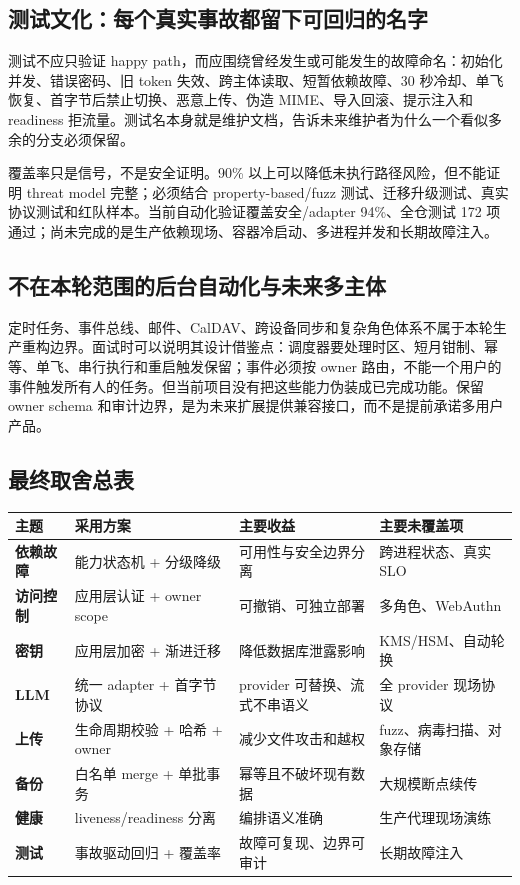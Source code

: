\subsection{测试文化：每个真实事故都留下可回归的名字}

测试不应只验证 happy path，而应围绕曾经发生或可能发生的故障命名：初始化并发、错误密码、旧 token 失效、跨主体读取、短暂依赖故障、30 秒冷却、单飞恢复、首字节后禁止切换、恶意上传、伪造 MIME、导入回滚、提示注入和 readiness 拒流量。测试名本身就是维护文档，告诉未来维护者为什么一个看似多余的分支必须保留。

覆盖率只是信号，不是安全证明。90\% 以上可以降低未执行路径风险，但不能证明 threat model 完整；必须结合 property-based/fuzz 测试、迁移升级测试、真实协议测试和红队样本。当前自动化验证覆盖安全/adapter 94\%、全仓测试 172 项通过；尚未完成的是生产依赖现场、容器冷启动、多进程并发和长期故障注入。

\subsection{不在本轮范围的后台自动化与未来多主体}

定时任务、事件总线、邮件、CalDAV、跨设备同步和复杂角色体系不属于本轮生产重构边界。面试时可以说明其设计借鉴点：调度器要处理时区、短月钳制、幂等、单飞、串行执行和重启触发保留；事件必须按 owner 路由，不能一个用户的事件触发所有人的任务。但当前项目没有把这些能力伪装成已完成功能。保留 owner schema 和审计边界，是为未来扩展提供兼容接口，而不是提前承诺多用户产品。

\subsection{最终取舍总表}

\begin{center}
\small
\begin{tabularx}{\textwidth}{>{\bfseries}lXXX}
\toprule
主题 & 采用方案 & 主要收益 & 主要未覆盖项 \\
\midrule
依赖故障 & 能力状态机 + 分级降级 & 可用性与安全边界分离 & 跨进程状态、真实 SLO \\
访问控制 & 应用层认证 + owner scope & 可撤销、可独立部署 & 多角色、WebAuthn \\
密钥 & 应用层加密 + 渐进迁移 & 降低数据库泄露影响 & KMS/HSM、自动轮换 \\
LLM & 统一 adapter + 首字节协议 & provider 可替换、流式不串语义 & 全 provider 现场协议 \\
上传 & 生命周期校验 + 哈希 + owner & 减少文件攻击和越权 & fuzz、病毒扫描、对象存储 \\
备份 & 白名单 merge + 单批事务 & 幂等且不破坏现有数据 & 大规模断点续传 \\
健康 & liveness/readiness 分离 & 编排语义准确 & 生产代理现场演练 \\
测试 & 事故驱动回归 + 覆盖率 & 故障可复现、边界可审计 & 长期故障注入 \\
\bottomrule
\end{tabularx}
\end{center}

